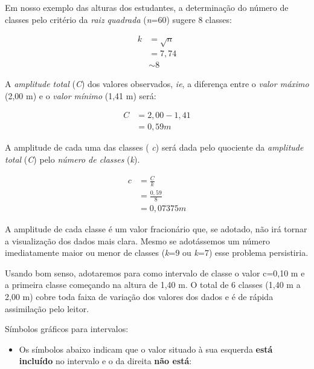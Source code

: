 \documentclass[
]{book}
\providecommand{\tightlist}{%
  \setlength{\itemsep}{0pt}\setlength{\parskip}{0pt}}
\begin{document}
\hfill\break

Em nosso exemplo das alturas dos estudantes, a determinação do número de classes pelo critério da \emph{raiz quadrada} (\emph{n}=60) sugere 8 classes:

\hfill\break

\begin{align*}
k & =\sqrt{n} \\
 & = 7,74 \\
 & \sim 8 
\end{align*}

\hfill\break

A \emph{amplitude total} (\emph{C}) dos valores observados, \emph{ie}, a diferença entre o \emph{valor máximo} (2,00 m) e o \emph{valor mínimo} (1,41 m) será:

\hfill\break

\begin{align*}
C & =2,00-1,41 \\
 & =0,59 m 
\end{align*}

\hfill\break

A amplitude de cada uma das classes ( \emph{c}) será dada pelo quociente da \emph{amplitude total} (\emph{C}) pelo \emph{número de classes} (\emph{k}).

\hfill\break

\begin{align*}
c & = \frac{C}{k} \\
  & = \frac{0,59}{8}\\ 
  & = 0,07375 m
\end{align*}

\hfill\break

A amplitude de cada classe é um valor fracionário que, se adotado, não irá tornar a visualização dos dados mais clara. Mesmo se adotássemos um número imediatamente maior ou menor de classes (\emph{k}=9 ou \emph{k}=7) esse problema persistiria.

\hfill\break

Usando bom senso, adotaremos para como intervalo de classe o valor c=0,10 m e a primeira classe começando na altura de 1,40 m.
O total de 6 classes (1,40 m a 2,00 m) cobre toda faixa de variação dos valores dos dados e é de rápida assimilação pelo leitor.

\hfill\break

Símbolos gráficos para intervalos:

\hfill\break

\begin{itemize}
\tightlist
\item
  Os símbolos abaixo indicam que o valor situado à sua esquerda \textbf{está incluído} no intervalo e o da direita \textbf{não está}:
\end{itemize}
\end{document}
